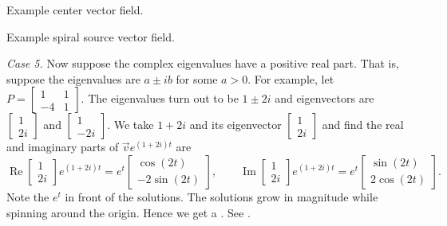 \begin{myfig}
\parbox[t]{3.0in}{
 \capstart
 \caption{Example center vector field.\label{pln:ellipsesfig}}
}
\quad
\parbox[t]{3.0in}{
 \capstart
 \caption{Example spiral source vector field.\label{pln:spiral-sourcefig}}
}
\end{myfig}

\medskip

\emph{Case 5.} Now suppose the complex eigenvalues have a positive real
part.  That is, suppose the eigenvalues are $a \pm ib$ for some $a > 0$.
For example, let $P = 
\left[ \begin{smallmatrix} 1 & 1 \\ -4 & 1 \end{smallmatrix} \right]$.
The eigenvalues turn out to be $1\pm 2i$ and eigenvectors are
$\left[ \begin{smallmatrix} 1 \\ 2i \end{smallmatrix} \right]$ and
$\left[ \begin{smallmatrix} 1 \\ -2i \end{smallmatrix} \right]$.  We take
$1 + 2i$ and its eigenvector
$\left[ \begin{smallmatrix} 1 \\ 2i \end{smallmatrix} \right]$ and find
the real and imaginary parts of
$\vec{v} e^{(1+2i)t}$ are
\begin{equation*}
\operatorname{Re}
\begin{bmatrix} 1 \\ 2i \end{bmatrix} e^{(1+2i)t} =
e^t
\begin{bmatrix} \cos (2t) \\ -2 \sin (2t)  \end{bmatrix} ,
\qquad
\operatorname{Im}
\begin{bmatrix} 1 \\ 2i \end{bmatrix} e^{(1+2i)t} =
e^t
\begin{bmatrix} \sin (2t) \\ 2 \cos (2t) \end{bmatrix} .
\end{equation*}
Note the $e^t$ in front of the solutions.  The solutions
grow in magnitude while spinning around the origin.  Hence we get
a \emph{}.
See .

